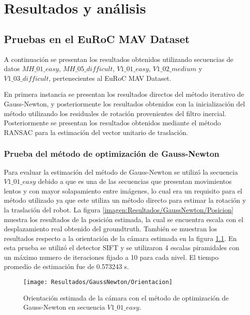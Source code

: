 \chapter{Resultados y análisis}
\label{capitulo6}

\section{Pruebas en el EuRoC MAV Dataset}
A continuación se presentan los resultados obtenidos
utilizando secuencias de datos  $MH\_ 01\_ easy$,  $MH\_ 05\_ difficult$,  $V1\_ 01\_ easy$,
$V1\_ 02\_ medium$ y  $V1\_ 03\_ difficult$, pertenecientes al EuRoC MAV Dataset.

En primera instancia se presentan los resultados directos del método iterativo de Gauss-Newton, y posteriormente los resultados obtenidos con la inicialización del método utilizando los residuales de rotación provenientes del filtro inercial. Posteriormente se presentan los resultados obtenidos mediante el método RANSAC para la estimación del vector unitario de traslación.


\subsection{Prueba del método de optimización de Gauss-Newton }

Para evaluar la estimación del método de Gauss-Newton se utilizó la secuencia $V1\_ 01\_ easy$ debido a que es una de las secuencias que presentan movimientos lentos y con mayor solapamiento entre imágenes, lo cual era un requisito para el método utilizado ya que este utiliza un método directo para estimar la rotación y la traslación del robot. La figura \ref{imagen:Resultados/GaussNewton/Posicion} muestra los resultados de la posición estimada, la cual se encuentra escala con el desplazamiento real obtenido del groundtruth. También se muestran los resultados respecto a la orientación de la cámara estimada en la figura \ref{imagen:Resultados/GaussNewton/Orientacion}. En esta prueba se utilizó el detector SIFT y se utilizaron 4 escalas piramidales con un máximo numero de iteraciones fijado a 10 para cada nivel. El tiempo promedio de estimación fue de 0.573243 s.

\begin{figure}[H]
	\centering
	\texttt{[image: Resultados/GaussNewton/Orientacion]}
	\caption{Orientación estimada de la cámara con el método de optimización de Gauss-Newton en secuencia $V1\_ 01\_ easy$. }
	\label{imagen:Resultados/GaussNewton/Orientacion}
\end{figure}

